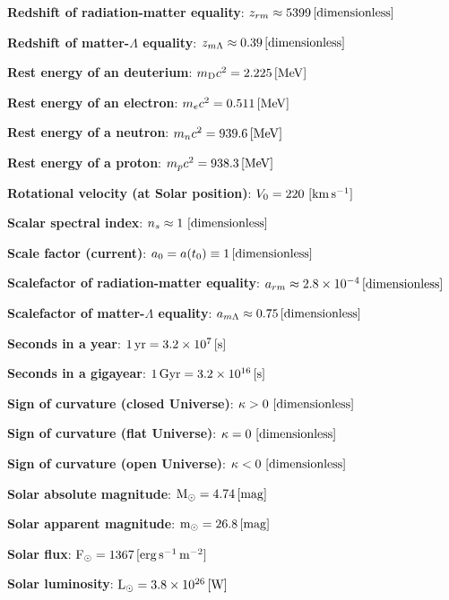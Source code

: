 \documentclass[a4paper,10pt]{article}
\begin{document}
{\noindent}\textbf{Redshift of radiation-matter equality}: $z_{rm} \approx 5399\,[{\rm dimensionless}]$

{\noindent}\textbf{Redshift of matter-$\Lambda$ equality}: $z_{m\Lambda}
\approx0.39\,[{\rm dimensionless}]$

{\noindent}\textbf{Rest energy of an deuterium}: $m_\mathrm{D}c^2 = 2.225\,[{\rm MeV}]$

{\noindent}\textbf{Rest energy of an electron}: $m_ec^2 = 0.511\,[{\rm MeV}]$

{\noindent}\textbf{Rest energy of a neutron}: $m_nc^2 = 939.6\,[{\rm MeV}]$

{\noindent}\textbf{Rest energy of a proton}: $m_pc^2 = 938.3\,[{\rm MeV}]$

{\noindent}\textbf{Rotational velocity (at Solar position)}: $V_0 = 220 ~ [{\rm km\,s^{-1}}]$

{\noindent}\textbf{Scalar spectral index}: $n_s\approx1 ~ [{\rm dimensionless}]$

{\noindent}\textbf{Scale factor (current)}: $a_0=a(t_0)\equiv1\,[{\rm dimensionless}]$

{\noindent}\textbf{Scalefactor of radiation-matter equality}: $a_{rm} \approx 2.8\times10^{-4}\,[{\rm dimensionless}]$

{\noindent}\textbf{Scalefactor of matter-$\Lambda$ equality}: $a_{m\Lambda}
\approx0.75\,[{\rm dimensionless}]$

{\noindent}\textbf{Seconds in a year}: $1\,{\rm yr} = 3.2\times10^7\,[{\rm s}]$

{\noindent}\textbf{Seconds in a gigayear}: $1\,{\rm Gyr} = 3.2\times10^{16}\,[{\rm s}]$

{\noindent}\textbf{Sign of curvature (closed Universe)}: $\kappa>0 ~ [{\rm dimensionless}]$

{\noindent}\textbf{Sign of curvature (flat Universe)}: $\kappa=0 ~ [{\rm dimensionless}]$

{\noindent}\textbf{Sign of curvature (open Universe)}: $\kappa<0 ~ [{\rm dimensionless}]$

{\noindent}\textbf{Solar absolute magnitude}: ${\rm M}_\odot = 4.74\,[{\rm mag}]$

{\noindent}\textbf{Solar apparent magnitude}: ${\rm m}_\odot = 26.8\,[{\rm mag}]$

{\noindent}\textbf{Solar flux}: ${\rm F}_\odot = 1367\,[{\rm erg\,s^{-1}\,m^{-2}}]$

{\noindent}\textbf{Solar luminosity}: ${\rm L}_\odot = 3.8\times10^{26}\,[{\rm W}]$
\end{document}

